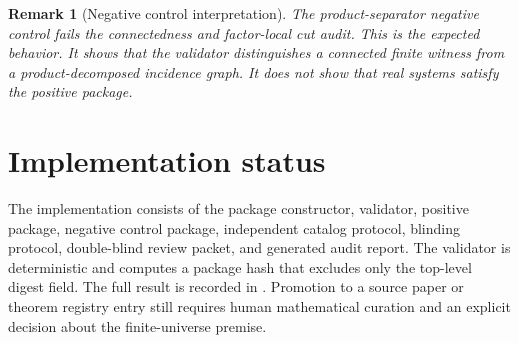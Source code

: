 \documentclass[11pt]{article}
\newtheorem{remark}[definition]{Remark}
\begin{document}
\begin{remark}[Negative control interpretation]
The product-separator negative control fails the connectedness and factor-local cut audit. This is the expected behavior. It shows that the validator distinguishes a connected finite witness from a product-decomposed incidence graph. It does not show that real systems satisfy the positive package.
\end{remark}

\section{Implementation status}
The implementation consists of the package constructor, validator, positive package, negative control package, independent catalog protocol, blinding protocol, double-blind review packet, and generated audit report. The validator is deterministic and computes a package hash that excludes only the top-level digest field. The full result is recorded in . Promotion to a source paper or theorem registry entry still requires human mathematical curation and an explicit decision about the finite-universe premise.

\printbibliography
\end{document}
